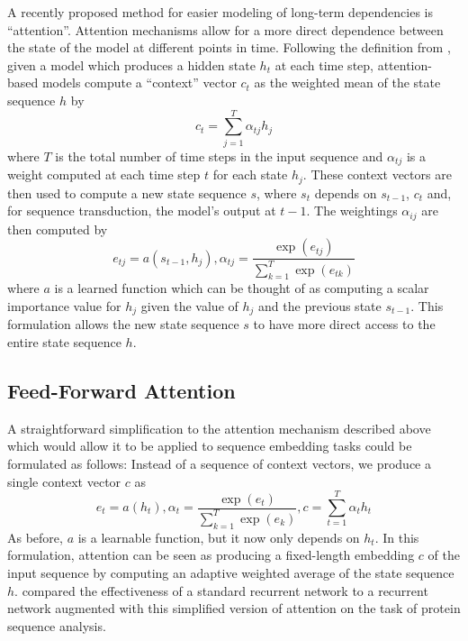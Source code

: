 \documentclass{article} %
\begin{document}
A recently proposed method for easier modeling of long-term dependencies is ``attention''.
Attention mechanisms allow for a more direct dependence between the state of the model at different points in time.
Following the definition from \cite{bahdanau2014neural}, given a model which produces a hidden state $h_t$ at each time step, attention-based models compute a ``context'' vector $c_t$ as the weighted mean of the state sequence $h$ by
$$
c_t = \sum_{j = 1}^T \alpha_{tj} h_j
$$
where $T$ is the total number of time steps in the input sequence and $\alpha_{tj}$ is a weight computed at each time step $t$ for each state $h_j$.
These context vectors are then used to compute a new state sequence $s$, where $s_t$ depends on $s_{t - 1}$, $c_t$ and, for sequence transduction, the model's output at $t - 1$.
The weightings $\alpha_{ij}$ are then computed by
\begin{equation*}
e_{tj} = a(s_{t - 1}, h_j), \alpha_{tj} = \frac{\exp(e_{tj})}{\sum_{k = 1}^T \exp(e_{tk})}
\end{equation*}
where $a$ is a learned function which can be thought of as computing a scalar importance value for $h_j$ given the value of $h_j$ and the previous state $s_{t - 1}$.
This formulation allows the new state sequence $s$ to have more direct access to the entire state sequence $h$.

\subsection{Feed-Forward Attention}

A straightforward simplification to the attention mechanism described above which would allow it to be applied to sequence embedding tasks could be formulated as follows:
Instead of a sequence of context vectors, we produce a single context vector $c$ as
\begin{equation}
\label{eq:ffattention}
e_t = a(h_t), \alpha_t = \frac{\exp(e_t)}{\sum_{k = 1}^T \exp(e_k)}, c = \sum_{t = 1}^T \alpha_t h_t
\end{equation}
As before, $a$ is a learnable function, but it now only depends on $h_t$.
In this formulation, attention can be seen as producing a fixed-length embedding $c$ of the input sequence by computing an adaptive weighted average of the state sequence $h$.
\cite{sonderby2015convolutional} compared the effectiveness of a standard recurrent network to a recurrent network augmented with this simplified version of attention on the task of protein sequence analysis.
\end{document}
